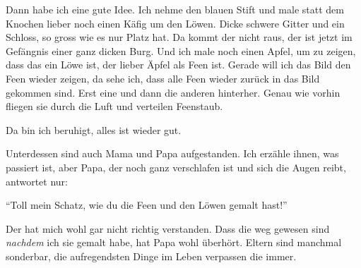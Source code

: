 Dann habe ich eine gute Idee. Ich nehme den blauen Stift und male statt dem Knochen lieber noch einen Käfig um den Löwen. Dicke schwere Gitter und ein Schloss, so gross wie es nur Platz hat. Da kommt der nicht raus, der ist jetzt im Gefängnis einer ganz dicken Burg. Und ich male noch einen Apfel, um zu zeigen, dass das ein Löwe ist, der lieber Äpfel als Feen ist. Gerade will ich das Bild den Feen wieder zeigen, da sehe ich, dass alle Feen wieder zurück in das Bild gekommen sind. Erst eine und dann die anderen hinterher. Genau wie vorhin fliegen sie durch die Luft und verteilen Feenstaub. 

Da bin ich beruhigt, alles ist wieder gut.

Unterdessen sind auch Mama und Papa aufgestanden. Ich erzähle ihnen, was passiert ist, aber Papa, der noch ganz verschlafen ist und sich die Augen reibt, antwortet nur: 

\enquote{Toll mein Schatz, wie du die Feen und den Löwen gemalt hast!} 

Der hat mich wohl gar nicht richtig verstanden. Dass die weg gewesen sind \emph{nachdem} ich sie gemalt habe, hat Papa wohl überhört. Eltern sind manchmal sonderbar, die aufregendsten Dinge im Leben verpassen die immer. \hfill {\color{red}\decofourleft}
